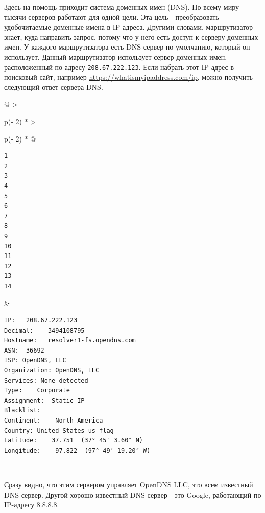 \documentclass{report}
\begin{document}
Здесь на помощь приходит система доменных имен (DNS). По всему миру
тысячи серверов работают для одной цели. Эта цель - преобразовать
удобочитаемые доменные имена в IP-адреса. Другими словами, маршрутизатор
знает, куда направить запрос, потому что у него есть доступ к серверу
доменных имен. У каждого маршрутизатора есть DNS-сервер по умолчанию,
который он использует. Данный маршрутизатор использует сервер доменных
имен, расположенный по адресу \texttt{208.67.222.123}. Если набрать этот
IP-адрес в поисковый сайт, например
\url{https://whatismyipaddress.com/ip}, можно получить следующий ответ
сервера DNS.

\begin{longtable}[]{@{}
  >{\raggedright\arraybackslash}p{(\columnwidth - 2\tabcolsep) * }
  >{\raggedright\arraybackslash}p{(\columnwidth - 2\tabcolsep) * }@{}}
\toprule
\endhead
\begin{minipage}[t]{\linewidth}\raggedright
\begin{verbatim}
1
2
3
4
5
6
7
8
9
10
11
12
13
14
\end{verbatim}
\end{minipage} & \begin{minipage}[t]{\linewidth}\raggedright
\begin{verbatim}
IP:   208.67.222.123
Decimal:    3494108795
Hostname:   resolver1-fs.opendns.com
ASN:  36692
ISP: OpenDNS, LLC
Organization: OpenDNS, LLC
Services: None detected
Type:    Corporate
Assignment:  Static IP
Blacklist:
Continent:    North America
Country: United States us flag
Latitude:    37.751  (37° 45′ 3.60″ N)
Longitude:   -97.822  (97° 49′ 19.20″ W)
\end{verbatim}
\end{minipage} \\ \addlinespace
\bottomrule
\end{longtable}

Сразу видно, что этим сервером управляет OpenDNS LLC, это всем известный
DNS-сервер. Другой хорошо известный DNS-сервер - это Google, работающий
по IP-адресу 8.8.8.8.
\end{document}
